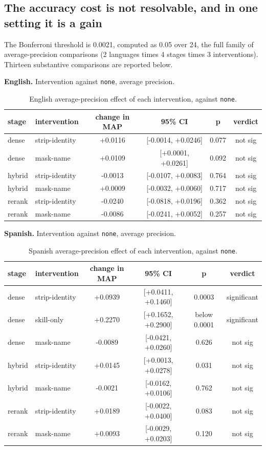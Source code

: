\documentclass{ceurart}
\begin{document}
\subsection{The accuracy cost is not resolvable, and in one setting it is a gain}

The Bonferroni threshold is 0.0021, computed as 0.05 over 24, the full family of
average-precision comparisons (2 languages times 4 stages times 3 interventions). Thirteen
substantive comparisons are reported below.

\textbf{English.} Intervention against \texttt{none}, average precision.

\begin{table}[!htb]
\centering
\caption{English average-precision effect of each intervention, against \texttt{none}.}
\label{tab:map_english}
\small
\setlength{\tabcolsep}{4.5pt}
\begin{tabular}{@{}llcccc@{}}
\toprule
stage & intervention & change in MAP & 95\% CI & p & verdict \\
\midrule
dense & strip-identity & +0.0116 & [-0.0014, +0.0246] & 0.077 & not sig \\
dense & mask-name & +0.0109 & [+0.0001, +0.0261] & 0.092 & not sig \\
hybrid & strip-identity & -0.0013 & [-0.0107, +0.0083] & 0.764 & not sig \\
hybrid & mask-name & +0.0009 & [-0.0032, +0.0060] & 0.717 & not sig \\
rerank & strip-identity & -0.0240 & [-0.0818, +0.0196] & 0.362 & not sig \\
rerank & mask-name & -0.0086 & [-0.0241, +0.0052] & 0.257 & not sig \\
\bottomrule
\end{tabular}
\end{table}

\textbf{Spanish.} Intervention against \texttt{none}, average precision.

\begin{table}[!htb]
\centering
\caption{Spanish average-precision effect of each intervention, against \texttt{none}.}
\label{tab:map_spanish}
\small
\setlength{\tabcolsep}{4.5pt}
\begin{tabular}{@{}llcccc@{}}
\toprule
stage & intervention & change in MAP & 95\% CI & p & verdict \\
\midrule
dense & strip-identity & +0.0939 & [+0.0411, +0.1460] & 0.0003 & significant \\
dense & skill-only & +0.2270 & [+0.1652, +0.2900] & below 0.0001 & significant \\
dense & mask-name & -0.0089 & [-0.0421, +0.0260] & 0.626 & not sig \\
hybrid & strip-identity & +0.0145 & [+0.0013, +0.0278] & 0.031 & not sig \\
hybrid & mask-name & -0.0021 & [-0.0162, +0.0106] & 0.762 & not sig \\
rerank & strip-identity & +0.0189 & [-0.0022, +0.0400] & 0.083 & not sig \\
rerank & mask-name & +0.0093 & [-0.0029, +0.0203] & 0.120 & not sig \\
\bottomrule
\end{tabular}
\end{table}
\end{document}
